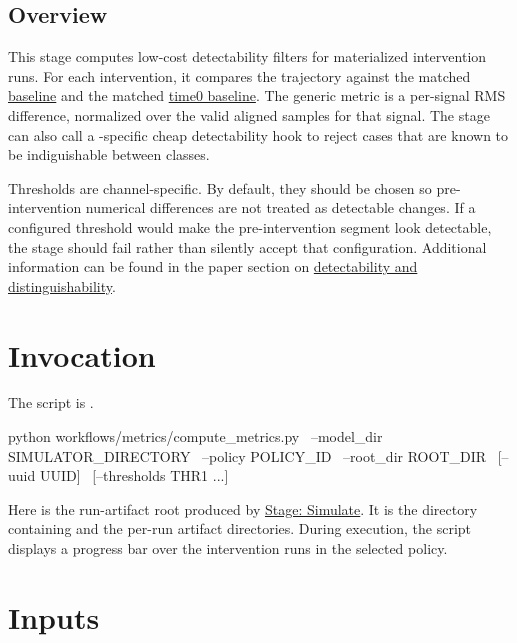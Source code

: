 \documentclass[11pt]{article}
\begin{document}
\label{docstart:cheap_filter_metrics_stage}

\subsection*{Overview}
This stage computes low-cost detectability filters for materialized intervention runs.
For each intervention, it compares the trajectory against the matched \hyperref[sec:candidate-generation-baseline-recipe]{baseline} and the matched \hyperref[sec:candidate-generation-time0-baseline-recipe]{time0 baseline}.
The generic metric is a per-signal RMS difference, normalized over the valid aligned samples for that signal.
The stage can also call a \termSimulator-specific cheap detectability hook to reject cases that are known to be indiguishable between classes.

Thresholds are channel-specific.
By default, they should be chosen so pre-intervention numerical differences are not treated as detectable changes.
If a configured threshold would make the pre-intervention segment look detectable, the stage should fail rather than silently accept that configuration.
Additional information can be found in the paper section on \hyperref[sec:detectability]{detectability and distinguishability}.

\section*{Invocation}

The script is .

\begin{DocCode}
python workflows/metrics/compute_metrics.py \
  --model_dir SIMULATOR_DIRECTORY \
  --policy POLICY_ID \
  --root_dir ROOT_DIR \
  [--uuid UUID] \
  [--thresholds THR1 ...] \
\end{DocCode}

Here \code{ROOT_DIR} is the run-artifact root produced by \hyperref[docstart:simulation_stage]{Stage: Simulate}.
It is the directory containing  and the per-run artifact directories.
During execution, the script displays a progress bar over the intervention runs in the selected policy.

\section*{Inputs}
\end{document}
